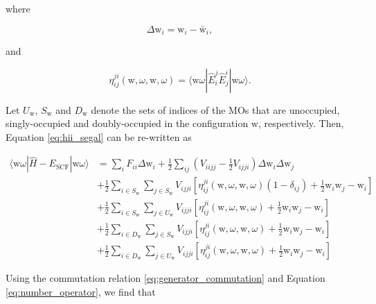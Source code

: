 \documentclass[12pt,a4paper]{report}
\begin{document}
\noindent
where

\begin{equation}
  \Delta \text{w}_{i} = \text{w}_{i} - \bar{\text{w}}_{i},
\end{equation}

\noindent
and

\begin{equation}\label{eq:eta_ijji}
  \eta_{ij}^{ji}(\text{w},\omega,\text{w},\omega) = \langle \text{w}
  \omega | \hat{E}_{i}^{j} \hat{E}_{j}^{i} | \text{w} \omega \rangle.
\end{equation}

Let $U_{\text{w}}$, $S_{\text{w}}$ and $D_{\text{w}}$ denote the sets
of indices of the MOs that are unoccupied, singly-occupied and
doubly-occupied in the configuration $\text{w}$, respectively. Then,
Equation \ref{eq:hii_segal} can be re-written as

\begin{equation}
  \begin{aligned}
    \langle \text{w} \omega | \hat{H} - E_{\text{SCF}} | \text{w}
    \omega \rangle &= \sum_{i} F_{ii} \Delta \text{w}_{i} +
    \frac{1}{2} \sum_{ij} \left( V_{iijj} - \frac{1}{2} V_{ijji}
    \right) \Delta \text{w}_{i} \Delta \text{w}_{j} \\
    &+ \frac{1}{2} \sum_{i \in S_{\text{w}}} \sum_{j \in S_{\text{w}}}
    V_{ijji} \left[ \eta_{ij}^{ji}(\text{w},\omega,\text{w},\omega)
      (1-\delta_{ij}) + \frac{1}{2} \text{w}_{i} \text{w}_{j} -
      \text{w}_{i} \right] \\
    &+ \frac{1}{2} \sum_{i \in S_{\text{w}}} \sum_{j \in U_{\text{w}}}
    V_{ijji} \left[ \eta_{ij}^{ji}(\text{w},\omega,\text{w},\omega) +
      \frac{1}{2} \text{w}_{i} \text{w}_{j} - \text{w}_{i} \right] \\
    &+ \frac{1}{2} \sum_{i \in D_{\text{w}}} \sum_{j \in S_{\text{w}}}
    V_{ijji} \left[ \eta_{ij}^{ji}(\text{w},\omega,\text{w},\omega) +
      \frac{1}{2} \text{w}_{i} \text{w}_{j} - \text{w}_{i} \right] \\
    &+ \frac{1}{2} \sum_{i \in D_{\text{w}}} \sum_{j \in U_{\text{w}}}
    V_{ijji} \left[ \eta_{ij}^{ji}(\text{w},\omega,\text{w},\omega) +
      \frac{1}{2} \text{w}_{i} \text{w}_{j} - \text{w}_{i} \right]
  \end{aligned}
\end{equation}

Using the commutation relation \ref{eq:generator_commutation} and
Equation \ref{eq:number_operator}, we find that
\end{document}
